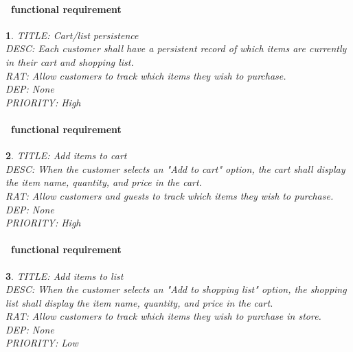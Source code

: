 \documentclass{scrreprt}
\theoremstyle{funreq}
\newtheorem{funreq}{}
\begin{document}
	\paragraph[]{\Subsectionname ~functional requirement }
	\begin{funreq}
		\label{cart_persist}
		TITLE: Cart/list persistence\\
		DESC: Each customer shall have a persistent record of which items are currently in their cart and shopping list.\\
		RAT: Allow customers to track which items they wish to purchase.\\
		DEP: None\\
		PRIORITY: High\\
	\end{funreq}
	
	\paragraph[]{\Subsectionname ~functional requirement }
	\begin{funreq}
		\label{cart_add}
		TITLE: Add items to cart\\
		DESC: When the customer selects an "Add to cart" option, the cart shall display the item name, quantity, and price in the cart.\\
		RAT: Allow customers and guests to track which items they wish to purchase.\\
		DEP: None\\
		PRIORITY: High\\
	\end{funreq}

	\paragraph[]{\Subsectionname ~functional requirement }
	\begin{funreq}
		\label{list_add}
		TITLE: Add items to list\\
		DESC: When the customer selects an "Add to shopping list" option, the shopping list shall display the item name, quantity, and price in the cart.\\
		RAT: Allow customers to track which items they wish to purchase in store.\\
		DEP: None\\
		PRIORITY: Low\\
	\end{funreq}
\end{document}

